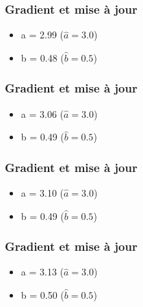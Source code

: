\documentclass{formation}
\begin{document}
\begin{frame}
  \frametitle{Gradient et mise à jour}
  \begin{itemize}
  \item a = 2.99 ($\hat{a} = 3.0$)
  \item b = 0.48 ($\hat{b} = 0.5$)
  \end{itemize}
\end{frame}

\begin{frame}
  \frametitle{Gradient et mise à jour}
  \begin{itemize}
  \item a = 3.06 ($\hat{a} = 3.0$)
  \item b = 0.49 ($\hat{b} = 0.5$)
  \end{itemize}
\end{frame}

\begin{frame}
  \frametitle{Gradient et mise à jour}
  \begin{itemize}
  \item a = 3.10 ($\hat{a} = 3.0$)
  \item b = 0.49 ($\hat{b} = 0.5$)
  \end{itemize}
\end{frame}

\begin{frame}
  \frametitle{Gradient et mise à jour}
  \begin{itemize}
  \item a = 3.13 ($\hat{a} = 3.0$)
  \item b = 0.50 ($\hat{b} = 0.5$)
  \end{itemize}
\end{frame}
\end{document}
